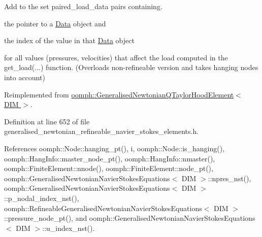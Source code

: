 Add to the set {\ttfamily paired\+\_\+load\+\_\+data} pairs containing. 


\begin{DoxyItemize}
\item the pointer to a \hyperlink{classoomph_1_1Data}{Data} object and
\item the index of the value in that \hyperlink{classoomph_1_1Data}{Data} object
\end{DoxyItemize}for all values (pressures, velocities) that affect the load computed in the {\ttfamily get\+\_\+load}(...) function. (Overloads non-\/refineable version and takes hanging nodes into account) 

Reimplemented from \hyperlink{classoomph_1_1GeneralisedNewtonianQTaylorHoodElement_a93fa12a6111a676cb6e7ac2528266d07}{oomph\+::\+Generalised\+Newtonian\+Q\+Taylor\+Hood\+Element$<$ D\+I\+M $>$}.



Definition at line 652 of file generalised\+\_\+newtonian\+\_\+refineable\+\_\+navier\+\_\+stokes\+\_\+elements.\+h.



References oomph\+::\+Node\+::hanging\+\_\+pt(), i, oomph\+::\+Node\+::is\+\_\+hanging(), oomph\+::\+Hang\+Info\+::master\+\_\+node\+\_\+pt(), oomph\+::\+Hang\+Info\+::nmaster(), oomph\+::\+Finite\+Element\+::nnode(), oomph\+::\+Finite\+Element\+::node\+\_\+pt(), oomph\+::\+Generalised\+Newtonian\+Navier\+Stokes\+Equations$<$ D\+I\+M $>$\+::npres\+\_\+nst(), oomph\+::\+Generalised\+Newtonian\+Navier\+Stokes\+Equations$<$ D\+I\+M $>$\+::p\+\_\+nodal\+\_\+index\+\_\+nst(), oomph\+::\+Refineable\+Generalised\+Newtonian\+Navier\+Stokes\+Equations$<$ D\+I\+M $>$\+::pressure\+\_\+node\+\_\+pt(), and oomph\+::\+Generalised\+Newtonian\+Navier\+Stokes\+Equations$<$ D\+I\+M $>$\+::u\+\_\+index\+\_\+nst().

\mbox{\label{classoomph_1_1RefineableGeneralisedNewtonianQTaylorHoodElement_ae0ff45825430e85d615efd287f4a5d6b}} 
